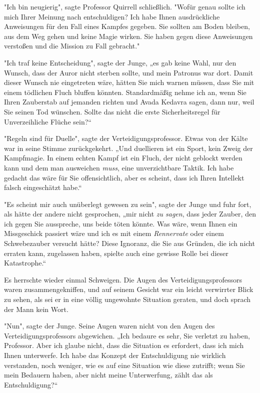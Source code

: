 {"Ich bin neugierig", sagte Professor Quirrell schließlich. "Wofür genau sollte ich mich Ihrer Meinung nach entschuldigen? Ich habe Ihnen ausdrückliche Anweisungen für den Fall eines Kampfes gegeben. Sie sollten am Boden bleiben, aus dem Weg gehen und keine Magie wirken. Sie haben gegen diese Anweisungen verstoßen und die Mission zu Fall gebracht."

"Ich traf keine Entscheidung", sagte der Junge, „es gab keine Wahl, nur den Wunsch, dass der Auror nicht sterben sollte, und mein Patronus war dort. Damit dieser Wunsch nie eingetreten wäre, hätten Sie mich warnen müssen, dass Sie mit einem tödlichen Fluch bluffen könnten. Standardmäßig nehme ich an, wenn Sie Ihren Zauberstab auf jemanden richten und Avada Kedavra sagen, dann nur, weil Sie seinen Tod wünschen. Sollte das nicht die erste Sicherheitsregel für Unverzeihliche Flüche sein?“

"Regeln sind für Duelle", sagte der Verteidigungsprofessor. Etwas von der Kälte war in seine Stimme zurückgekehrt. „Und duellieren ist ein Sport, kein Zweig der Kampfmagie. In einem echten Kampf ist ein Fluch, der nicht geblockt werden kann und dem man ausweichen \emph{muss}, eine unverzichtbare Taktik. Ich habe gedacht das wäre für Sie offensichtlich, aber es scheint, dass ich Ihren Intellekt falsch eingeschätzt habe.“

"Es scheint mir auch unüberlegt gewesen zu sein", sagte der Junge und fuhr fort, als hätte der andere nicht gesprochen, „mir nicht \emph{zu sagen}, dass jeder Zauber, den ich gegen Sie ausspreche, uns beide töten könnte. Was wäre, wenn Ihnen ein Missgeschick passiert wäre und ich es mit einem \emph{Rennervate} oder einem Schwebezauber versucht hätte? Diese Ignoranz, die Sie aus Gründen, die ich nicht erraten kann, zugelassen haben, spielte auch eine gewisse Rolle bei dieser Katastrophe.“

Es herrschte wieder einmal Schweigen. Die Augen des Verteidigungsprofessors waren zusammengekniffen, und auf seinem Gesicht war ein leicht verwirrter Blick zu sehen, als sei er in eine völlig ungewohnte Situation geraten, und doch sprach der Mann kein Wort.

"Nun", sagte der Junge. Seine Augen waren nicht von den Augen des Verteidigungsprofessors abgewichen. „Ich bedaure es sehr, Sie verletzt zu haben, Professor. Aber ich glaube nicht, dass die Situation es erfordert, dass ich mich Ihnen unterwerfe. Ich habe das Konzept der Entschuldigung nie wirklich verstanden, noch weniger, wie es auf eine Situation wie diese zutrifft; wenn Sie mein Bedauern haben, aber nicht meine Unterwerfung, zählt das als Entschuldigung?“

}
